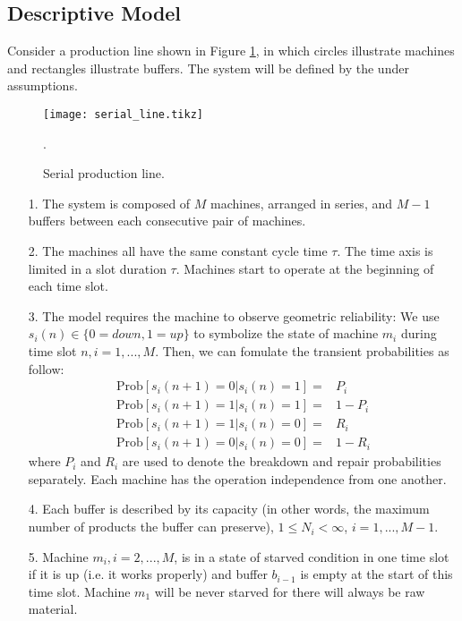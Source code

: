 \subsection{Descriptive Model}
\noindent Consider a production line shown in Figure \ref{serial production line}, in which circles illustrate machines and rectangles illustrate buffers. The system will be defined by the under assumptions.

\begin{figure*}[!ht]
	\centering
	\texttt{[image: serial\_line.tikz]}
	\caption{Serial production line.}
	\label{serial production line}.
\end{figure*}

\begin{itemize}
    \item[1.] The system is composed of $M$ machines, arranged in series, and $M-1$ buffers between each consecutive pair of machines.
    \item[2.] The machines all have the same constant cycle time $\tau$. The time axis is limited in a slot duration $\tau$. Machines start to operate at the beginning of each time slot.
    \item[3.] The model requires the machine to observe geometric reliability: We use $s_i(n) \in \{0 = down, 1 = up\} $ to symbolize the state of machine $m_i$ during time slot $n, i = 1, ..., M$. Then, we can fomulate the transient probabilities as follow:
    \begin{equation}
        \begin{aligned}
            \text{Prob}[s_i(n+1)=0|s_i(n)=1]=&P_i \\
            \text{Prob}[s_i(n+1)=1|s_i(n)=1]=&1-P_i \\
            \text{Prob}[s_i(n+1)=1|s_i(n)=0]=&R_i \\
            \text{Prob}[s_i(n+1)=0|s_i(n)=0]=&1-R_i
        \end{aligned}
        \label{transition probabilities}
    \end{equation}
    where $ P_i $ and $R_i$ are used to denote the breakdown and repair probabilities separately. Each machine has the operation independence from one another.
    \item[4.] Each buffer is described by its capacity (in other words, the maximum number of products the buffer can preserve), $1 \leq N_i < \infty$, $i = 1, ..., M-1$.
    \item[5.] Machine $m_i, i = 2, ..., M$, is in a state of starved condition in one time slot if it is up (i.e. it works properly) and buffer $b_{i-1}$ is empty at the start of this time slot. Machine $m_1$ will be never starved for there will always be raw material.

\end{itemize}
